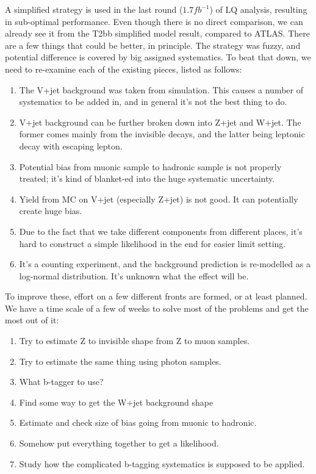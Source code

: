 


A simplified strategy is used in the last round ($1.7 fb^{-1}$) of LQ analysis,
resulting in sub-optimal performance.  Even though there is no direct comparison,
we can already see it from the T2bb simplified model result, compared to ATLAS.
There are a few things that could be better, in principle.
The strategy was fuzzy, and potential difference is covered by big assigned
systematics.  To beat that down, we need to re-examine each of the
existing pieces, listed as follows:

\begin{enumerate}
\item The V+jet background was taken from simulation.  This causes a number of
systematics to be added in, and in general it's not the best thing to do.
\item V+jet background can be further broken down into Z+jet and W+jet.
The former comes mainly from the invisible decays, and the latter being
leptonic decay with escaping lepton.
\item Potential bias from muonic sample to hadronic sample is not properly
treated; it's kind of blanket-ed into the huge systematic uncertainty.
\item Yield from MC on V+jet (especially Z+jet) is not good.  It can potentially create huge bias.
\item Due to the fact that we take different components from different places,
it's hard to construct a simple likelihood in the end for easier limit setting.
\item It's a counting experiment, and the background prediction is re-modelled as
a log-normal distribution.  It's unknown what the effect will be.
\end{enumerate}

To improve these, effort on a few different fronts are formed, or at least planned.
We have a time scale of a few of weeks to solve most of the problems and get
the most out of it:

\begin{enumerate}
\item Try to estimate Z to invisible shape from Z to muon samples.
\item Try to estimate the same thing using photon samples.
\item What b-tagger to use?
\item Find some way to get the W+jet background shape
\item Estimate and check size of bias going from muonic to hadronic.
\item Somehow put everything together to get a likelihood.
\item Study how the complicated b-tagging systematics is supposed to be applied.
\end{enumerate}

